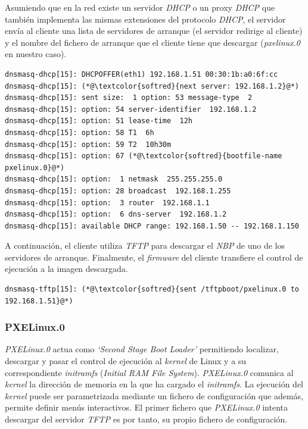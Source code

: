 \documentclass[a4paper,12pt,spanish,final]{epsc_tfc_pfc}
\begin{document}
Asumiendo que en la red existe un servidor \emph{DHCP} o un proxy \emph{DHCP} que también implementa las mismas extensiones del protocolo \emph{DHCP}, el servidor envía al cliente una lista de servidores de arranque (el servidor redirige al cliente) y el nombre del fichero de arranque que el cliente tiene que descargar (\emph{pxelinux.0} en nuestro caso).\\

\begin{lstlisting}[style=dnsmasq]
dnsmasq-dhcp[15]: DHCPOFFER(eth1) 192.168.1.51 00:30:1b:a0:6f:cc
dnsmasq-dhcp[15]: (*@\textcolor{softred}{next server: 192.168.1.2}@*)
dnsmasq-dhcp[15]: sent size:  1 option: 53 message-type  2
dnsmasq-dhcp[15]: option: 54 server-identifier  192.168.1.2
dnsmasq-dhcp[15]: option: 51 lease-time  12h
dnsmasq-dhcp[15]: option: 58 T1  6h
dnsmasq-dhcp[15]: option: 59 T2  10h30m
dnsmasq-dhcp[15]: option: 67 (*@\textcolor{softred}{bootfile-name  pxelinux.0}@*)
dnsmasq-dhcp[15]: option:  1 netmask  255.255.255.0
dnsmasq-dhcp[15]: option: 28 broadcast  192.168.1.255
dnsmasq-dhcp[15]: option:  3 router  192.168.1.1
dnsmasq-dhcp[15]: option:  6 dns-server  192.168.1.2
dnsmasq-dhcp[15]: available DHCP range: 192.168.1.50 -- 192.168.1.150
\end{lstlisting}

A continuación, el cliente utiliza \emph{TFTP} para descargar el \emph{NBP} de uno de los servidores de arranque. Finalmente, el \emph{firmware} del cliente transfiere el control de ejecución a la imagen descargada.\\

\begin{lstlisting}[style=dnsmasq]
dnsmasq-tftp[15]: (*@\textcolor{softred}{sent /tftpboot/pxelinux.0 to 192.168.1.51}@*)
\end{lstlisting}

\subsubsection{PXELinux.0}
\emph{PXELinux.0} actua como \emph{`Second Stage Boot Loader'} permitiendo localizar, descargar y pasar el control de ejecución al \emph{kernel} de Linux y a su correspondiente \emph{initramfs} (\emph{Initial RAM File System}). \emph{PXELinux.0} comunica al \emph{kernel} la dirección de memoria en la que ha cargado el \emph{initramfs}. La ejecución del \emph{kernel} puede ser parametrizada mediante un fichero de configuración que además, permite definir menús interactivos. El primer fichero que \emph{PXELinux.0} intenta descargar del servidor \emph{TFTP} es por tanto, su propio fichero de configuración.
\end{document}
